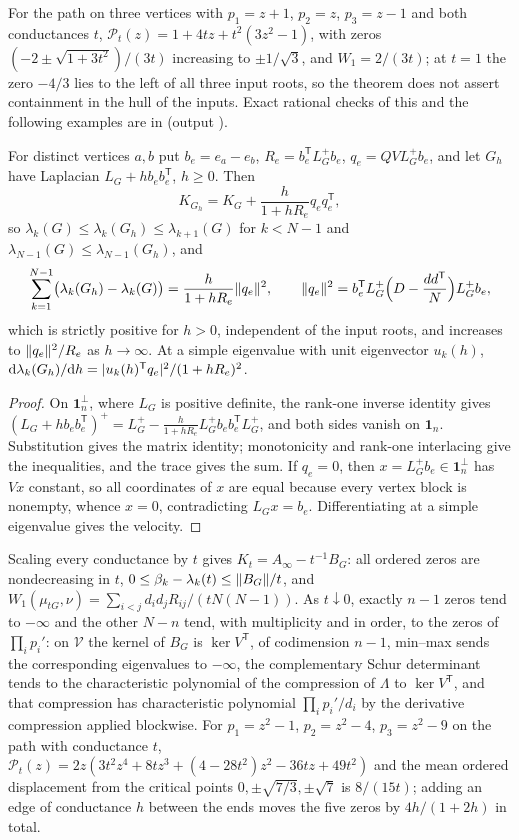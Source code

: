 For the path on three vertices with $p_1=z+1$, $p_2=z$, $p_3=z-1$ and both conductances $t$,
$\mathcal P_t(z)=1+4tz+t^2(3z^2-1)$, with zeros $(-2\pm\sqrt{1+3t^2})/(3t)$ increasing to
$\pm1/\sqrt3$, and $W_1=2/(3t)$; at $t=1$ the zero $-4/3$ lies to the left of all three input
roots, so the theorem does not assert containment in the hull of the inputs. Exact rational checks
of this and the following examples are in
 (output
).

\begin{theorem}\label{zer:thm:edgelaw}
For distinct vertices $a,b$ put $b_e=e_a-e_b$, $R_e=b_e^{\mathsf T}L_G^+b_e$, $q_e=QVL_G^+b_e$, and
let $G_h$ have Laplacian $L_G+hb_eb_e^{\mathsf T}$, $h\ge0$. Then
\[
 K_{G_h}=K_G+\frac h{1+hR_e}q_eq_e^{\mathsf T},
\]
so $\lambda_k(G)\le\lambda_k(G_h)\le\lambda_{k+1}(G)$ for $k<N-1$ and
$\lambda_{N-1}(G)\le\lambda_{N-1}(G_h)$, and
\[
 \sum_{k=1}^{N-1}\bigl(\lambda_k(G_h)-\lambda_k(G)\bigr)=\frac h{1+hR_e}\lVert q_e\rVert^2,\qquad
 \lVert q_e\rVert^2=b_e^{\mathsf T}L_G^+\Bigl(D-\frac{dd^{\mathsf T}}N\Bigr)L_G^+b_e ,
\]
which is strictly positive for $h>0$, independent of the input roots, and increases to
$\lVert q_e\rVert^2/R_e$ as $h\to\infty$. At a simple eigenvalue with unit eigenvector $u_k(h)$,
$\mathrm{d}\lambda_k(G_h)/\mathrm{d} h=\lvert u_k(h)^{\mathsf T}q_e\rvert^2/(1+hR_e)^2$.
\end{theorem}
\begin{proof}
On $\mathbf 1_n^\perp$, where $L_G$ is positive definite, the rank-one inverse identity gives
$(L_G+hb_eb_e^{\mathsf T})^+=L_G^+-\frac h{1+hR_e}L_G^+b_eb_e^{\mathsf T}L_G^+$, and both sides vanish on
$\mathbf 1_n$. Substitution gives the matrix identity; monotonicity and rank-one interlacing give the
inequalities, and the trace gives the sum. If $q_e=0$, then $x=L_G^+b_e\in\mathbf 1_n^\perp$ has $Vx$
constant, so all coordinates of $x$ are equal because every vertex block is nonempty, whence $x=0$,
contradicting $L_Gx=b_e$. Differentiating at a simple eigenvalue gives the velocity.
\end{proof}

Scaling every conductance by $t$ gives $K_t=A_\infty-t^{-1}B_G$: all ordered zeros are nondecreasing in
$t$, $0\le\beta_k-\lambda_k(t)\le\lVert B_G\rVert/t$, and $W_1(\mu_{tG},\nu)=\sum_{i<j}d_id_jR_{ij}/(tN(N-1))$. As
$t\downarrow0$, exactly $n-1$ zeros tend to $-\infty$ and the other $N-n$ tend, with multiplicity and
in order, to the zeros of $\prod_ip_i'$: on $\mathcal V$ the kernel of $B_G$ is $\ker V^{\mathsf T}$, of
codimension $n-1$, min--max sends the corresponding eigenvalues to $-\infty$, the complementary Schur
determinant tends to the characteristic polynomial of the compression of $\Lambda$ to
$\ker V^{\mathsf T}$, and that compression has characteristic polynomial $\prod_ip_i'/d_i$ by the
derivative compression applied blockwise. For $p_1=z^2-1$, $p_2=z^2-4$, $p_3=z^2-9$ on the path with
conductance $t$, $\mathcal P_t(z)=2z(3t^2z^4+8tz^3+(4-28t^2)z^2-36tz+49t^2)$ and the mean ordered
displacement from the critical points $0,\pm\sqrt{7/3},\pm\sqrt7$ is $8/(15t)$; adding an edge of
conductance $h$ between the ends moves the five zeros by $4h/(1+2h)$ in total.

